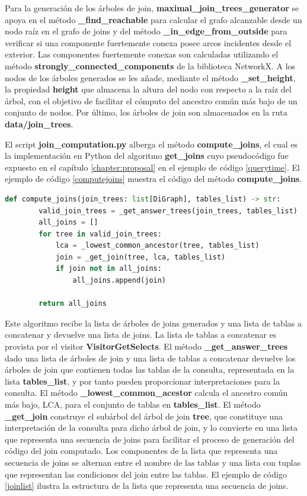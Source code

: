 Para la generación de los \'arboles de join, \textbf{maximal\_join\_trees\_generator} se apoya en 
el m\'etodo \textbf{\_find\_reachable} para calcular el grafo alcanzable desde un nodo ra\'iz en el grafo 
de joins y del m\'etodo \textbf{\_in\_edge\_from\_outside} para verificar si una componente fuertemente 
conexa posee arcos incidentes desde el exterior. Las componentes fuertemente conexas son calculadas 
utilizando el m\'etodo \textbf{strongly\_connected\_components} de la biblioteca NetworkX. A los nodos 
de los \'arboles generados se les añade, mediante el método \textbf{\_set\_height}, la propiedad \textbf{height} que almacena 
la altura del nodo con respecto a la raíz del \'arbol, con el objetivo de facilitar el c\'omputo 
del ancestro com\'un m\'as bajo de un conjunto de nodos. Por \'ultimo, 
los árboles de join son almacenados en la ruta \textbf{data/join\_trees}.


El script \textbf{join\_computation.py} alberga el m\'etodo \textbf{compute\_joins}, el cual es la implementación 
en Python del algoritmo \textbf{get\_joins} cuyo pseudoc\'odigo fue expuesto en el capítulo \ref{chapter:proposal} 
en el ejemplo de c\'odigo \ref{querytime}. El ejemplo de c\'odigo \ref{computejoins} muestra el c\'odigo del 
m\'etodo \textbf{compute\_joins}.

\begin{lstlisting}[label={computejoins}, caption={C\'odigo del m\'etodo \textbf{compute\_joins}}, language={python}]
    def compute_joins(join_trees: list[DiGraph], tables_list) -> str:
        valid_join_trees = _get_answer_trees(join_trees, tables_list)
        all_joins = []
        for tree in valid_join_trees:
            lca = _lowest_common_ancestor(tree, tables_list)
            join = _get_join(tree, lca, tables_list)
            if join not in all_joins:
                all_joins.append(join)

        return all_joins
\end{lstlisting}

Este algoritmo recibe la lista de \'arboles de joins generados y una 
lista de tablas a concatenar y devuelve una lista de joins. La lista de tablas a concatenar es provista por el 
visitor \textbf{VisitorGetSelects}. El m\'etodo \textbf{\_get\_answer\_trees} dado una lista de 
\'arboles de join y una lista de tablas a concatenar devuelve los \'arboles de join que contienen todas las tablas de 
la consulta, representada en la lista \textbf{tables\_list}, y por tanto pueden proporcionar interpretaciones 
para la consulta. El m\'etodo \textbf{\_lowest\_common\_acestor} calcula el ancestro com\'un m\'as bajo, LCA, para el 
conjunto de tablas en \textbf{tables\_list}. El m\'etodo \textbf{\_get\_join} construye el subárbol del \'arbol 
de join \textbf{tree}, que constituye una interpretaci\'on de la consulta para dicho \'arbol de join, y lo 
convierte en una lista que representa una secuencia de joins para facilitar el proceso de generación del c\'odigo del join computado. 
Los componentes de la lista que representa una secuencia de joins se alternan entre el nombre de las tablas 
y una lista con tuplas que representan las condiciones del join entre las tablas. El ejemplo de c\'odigo \ref{joinlist}
ilustra la estructura de la lista que representa una secuencia de joins.

